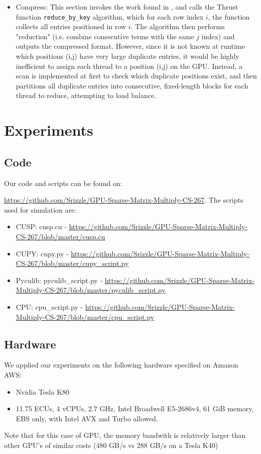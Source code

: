 \documentclass[12pt]{article}
\def\code#1{\texttt{#1}}
\begin{document}
\begin{itemize}
\item Compress: This section invokes the work found in \cite{multigrid}, and calls the Thrust function \code{reduce\_by\_key} algorithm, which for each row index $i$, the function collects all entries positioned in row $i$. The algorithm then performs "reduction" (i.e. combine consecutive terms with the same $j$ index) and outputs the compressed format. However, since it is not known at runtime which positions (i,j) have very large duplicate entries, it would be highly inefficient to assign each thread to a position (i,j) on the GPU. Instead, a scan is implemented at first to check which duplicate positions exist, and then partitions all duplicate entries into consecutive, fixed-length blocks for each thread to reduce, attempting to load balance. 
\end{itemize}



\section{Experiments}

\subsection{Code}
Our code and scripts can be found on:

\url{https://github.com/Srizzle/GPU-Sparse-Matrix-Multiply-CS-267}. The scripts used for simulation are: 
\begin{itemize}
\item CUSP: cusp.cu - \url{https://github.com/Srizzle/GPU-Sparse-Matrix-Multiply-CS-267/blob/master/cusp.cu}
\item CUPY: cupy.py - \url{https://github.com/Srizzle/GPU-Sparse-Matrix-Multiply-CS-267/blob/master/cupy_script.py}
\item Pyculib: pyculib\_script.py - \url{https://github.com/Srizzle/GPU-Sparse-Matrix-Multiply-CS-267/blob/master/pyculib_script.py}
\item CPU: cpu\_script.py - \url{https://github.com/Srizzle/GPU-Sparse-Matrix-Multiply-CS-267/blob/master/cpu_script.py}
\end{itemize}


\subsection{Hardware}
We applied our experiments on the following hardware specified on Amazon AWS:
\begin{itemize}
\item Nvidia Tesla K80 
\item 11.75 ECUs, 4 vCPUs, 2.7 GHz, Intel Broadwell E5-2686v4, 61 GiB memory, EBS only, with Intel AVX and Turbo allowed. 
\end{itemize}
Note that for this case of GPU, the memory bandwith is relatively larger than other GPU's of similar costs (480 GB/s vs 288 GB/s on a Tesla K40) 
\end{document}
